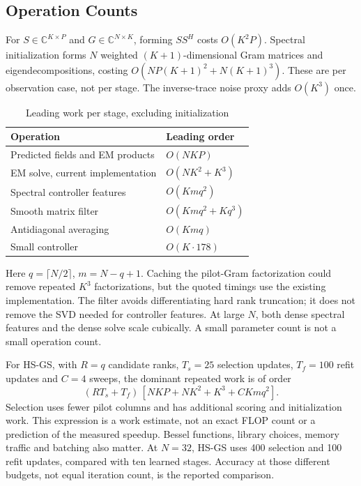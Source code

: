 \documentclass[journal]{IEEEtran}
\begin{document}
\subsection{Operation Counts}
For $S\in\mathbb C^{K\times P}$ and $G\in\mathbb C^{N\times K}$,
forming $SS^H$ costs $O(K^2P)$. Spectral initialization forms $N$
weighted $(K+1)$-dimensional Gram matrices and eigendecompositions,
costing $O(NP(K+1)^2+N(K+1)^3)$. These are per observation case,
not per stage. The inverse-trace noise proxy adds $O(K^3)$ once.

\begin{table}[!t]
\caption{Leading work per stage, excluding initialization}
\centering\small
\begin{tabular}{@{}p{}p{}@{}}\toprule
Operation & Leading order\\\midrule
Predicted fields and EM products & $O(NKP)$\\
EM solve, current implementation & $O(NK^2+K^3)$\\
Spectral controller features & $O(Kmq^2)$\\
Smooth matrix filter & $O(Kmq^2+Kq^3)$\\
Antidiagonal averaging & $O(Kmq)$\\
Small controller & $O(K\cdot178)$\\\bottomrule
\end{tabular}
\end{table}
Here $q=\lceil N/2\rceil$, $m=N-q+1$. Caching the pilot-Gram
factorization could remove repeated $K^3$ factorizations, but the quoted
timings use the existing implementation. The filter avoids differentiating
hard rank truncation; it does not remove the SVD needed for controller
features. At large $N$, both dense spectral features and the dense solve
scale cubically. A small parameter count is not a small operation count.

For HS-GS, with $R=q$ candidate ranks, $T_s=25$ selection updates,
$T_f=100$ refit updates and $C=4$ sweeps, the dominant repeated work is
of order
\begin{equation}
 (RT_s+T_f)\,[NKP+NK^2+K^3+C Kmq^2].
\end{equation}
Selection uses fewer pilot columns and has additional scoring and
initialization work. This expression is a work estimate, not an exact
FLOP count or a prediction of the measured speedup. Bessel functions,
library choices, memory traffic and batching also matter. At $N=32$,
HS-GS uses 400 selection and 100 refit updates, compared with ten learned
stages. Accuracy at those different budgets, not equal iteration count,
is the reported comparison.
\end{document}
